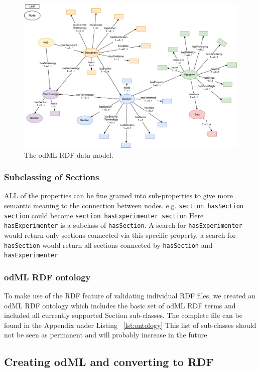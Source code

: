 \documentclass{article}
\begin{document}
\begin{figure}
\begin{center}
\includegraphics[width=0.90\columnwidth]{figures/odmlRDFDataModel.pdf}
\caption{The odML RDF data model.}
\label{fig:rdfModel}
\end{center}
\end{figure}

\subsubsection{Subclassing of Sections} \label{sec:rdf_subclassing}
ALL of the properties can be fine grained into sub-properties to give more semantic meaning to the connection between nodes.
e.g.
    \texttt{section hasSection section}
 could become
    \texttt{section hasExperimenter section}
Here \texttt{hasExperimenter} is a subclass of \texttt{hasSection}. A search for \texttt{hasExperimenter} would return only sections connected via this specific property, a search for \texttt{hasSection} would return all sections connected by \texttt{hasSection} and \texttt{hasExperimenter}.

\subsubsection{odML RDF ontology} \label{sec:odml_ontology}
To make use of the RDF feature of validating individual RDF files, we created an odML RDF ontology which includes the basic set of odML RDF terms and included all currently supported Section sub-classes. The complete file can be found in the Appendix under Listing ~\ref{lst:ontology} This list of sub-classes should not be seen as permanent and will probably increase in the future.

\subsection{Creating odML and converting to RDF} \label{sec:odml_to_rdf}
\end{document}
